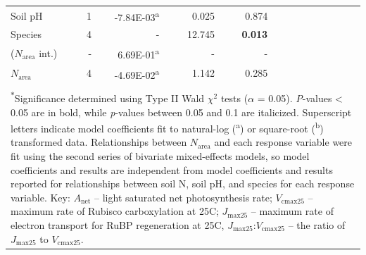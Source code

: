 \begin{landscape}
\begin{table}[]
{\begin{tabular}{p{2.5cm}p{0.5cm}p{2cm}p{1.5cm}p{1.5cm}p{2cm}p{1.5cm}p{1.5cm}p{2cm}p{1.5cm}p{1.5cm}}
                 Soil pH & \multicolumn{1}{r}{1}
                 & \multicolumn{1}{r}{-7.84E-03\textsuperscript{a}} & \multicolumn{1}{r}{0.025} & \multicolumn{1}{r}{0.874}
                 &&&&&& 
                 \\

                 Species & \multicolumn{1}{r}{4}
                 & \multicolumn{1}{r}{-} & \multicolumn{1}{r}{12.745} & \multicolumn{1}{r}{\textbf{0.013}} \\
                 \hline

                 ($N_\mathrm{area}$ int.) & \multicolumn{1}{r}{-}
                 & \multicolumn{1}{r}{6.69E-01\textsuperscript{a}} & \multicolumn{1}{r}{-} & \multicolumn{1}{r}{-}
                 &&&&&& 
                 \\

                 $N_\mathrm{area}$ & \multicolumn{1}{r}{4}
                 & \multicolumn{1}{r}{-4.69E-02\textsuperscript{a}} & \multicolumn{1}{r}{1.142} & \multicolumn{1}{r}{0.285}
                 &&&&&
                 \\
                 \hline

                 &&&&&&&&&& 
                 \\

                 \multicolumn{11}{p{22.5cm}}{\textsuperscript{$*$}Significance determined using Type II Wald $\chi^{2}$ tests ($\alpha$ = 0.05). \textit{P}-values < 0.05 are in bold, while \textit{p}-values between 0.05 and 0.1 are italicized. Superscript letters indicate model coefficients fit to natural-log (\textsuperscript{a}) or square-root (\textsuperscript{b}) transformed data. Relationships between $N_\mathrm{area}$ and each response variable were fit using the second series of bivariate mixed-effects models, so model coefficients and results are independent from model coefficients and results reported for relationships between soil N, soil pH, and species for each response variable. Key: $A_\mathrm{net}$ – light saturated net photosynthesis rate; $V_\mathrm{cmax25}$ – maximum rate of Rubisco carboxylation at 25\textdegree{}C; $J_\mathrm{max25}$ – maximum rate of electron transport for RuBP regeneration at 25\textdegree{}C, $J_{\mathrm{max25}}$:$V_\mathrm{cmax25}$ – the ratio of $J_\mathrm{max25}$ to $V_\mathrm{cmax25}$.}
        \end{tabular}}
        \label{tab:table3.2}
        \end{table}
    \end{landscape}
    \clearpage


